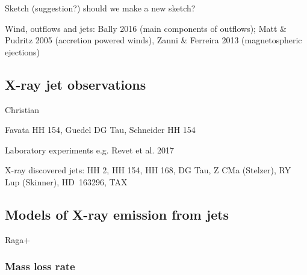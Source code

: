 Sketch (suggestion?) should we make a new sketch?

Wind, outflows and jets: Bally 2016 (main components of outflows); Matt \& Pudritz 2005 (accretion powered winds), Zanni \& Ferreira 2013 (magnetospheric ejections)


\subsection{X-ray jet observations}


{\color{blue}Christian

Favata HH 154, Guedel DG Tau, Schneider HH 154

Laboratory experiments  e.g. Revet et al. 2017
}

X-ray discovered jets: HH 2, HH 154, HH 168, DG Tau, Z CMa (Stelzer), RY Lup (Skinner), HD~163296, TAX

\subsection{Models of X-ray emission from jets}

Raga+



\subsubsection{Mass loss rate}

